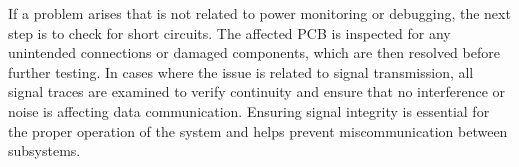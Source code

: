 \hspace{10pt} If a problem arises that is not related to power monitoring or debugging, the next step is to check for short circuits. The affected PCB is inspected for any unintended connections or damaged components, which are then resolved before further testing. In cases where the issue is related to signal transmission, all signal traces are examined to verify continuity and ensure that no interference or noise is affecting data communication. Ensuring signal integrity is essential for the proper operation of the system and helps prevent miscommunication between subsystems.
